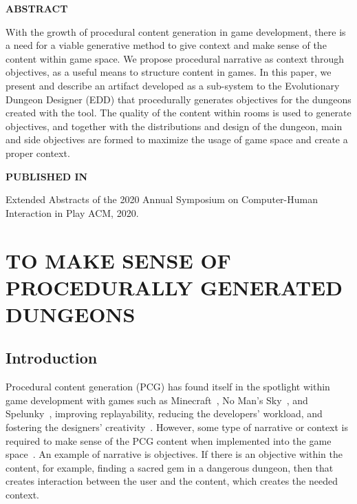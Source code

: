 


\normalfont
\textbf{\textsc{ABSTRACT}}

With the growth of procedural content generation in game development, there is a need for a viable generative method to give context and make sense of the content within game space. We propose procedural narrative as context through objectives, as a useful means to structure content in games. In this paper, we present and describe an artifact developed as a sub-system to the Evolutionary Dungeon Designer (EDD) that procedurally generates objectives for the dungeons created with the tool. The quality of the content within rooms is used to generate objectives, and together with the distributions and design of the dungeon, main and side objectives are formed to maximize the usage of game space and create a proper context.

\textbf{\textsc{PUBLISHED IN}}

Extended Abstracts of the 2020 Annual Symposium on Computer-Human Interaction in Play ACM, 2020.

\section*{TO MAKE SENSE OF PROCEDURALLY GENERATED DUNGEONS}

\subsection{Introduction}
Procedural content generation (PCG) has found itself in the spotlight within game development with games such as Minecraft~, No Man's Sky~, and Spelunky~, improving replayability, reducing the developers' workload, and fostering the designers' creativity~. However, some type of narrative or context is required to make sense of the PCG content when implemented into the game space~. An example of narrative is objectives. If there is an objective within the content, for example, finding a sacred gem in a dangerous dungeon, then that creates interaction between the user and the content, which creates the needed context.

